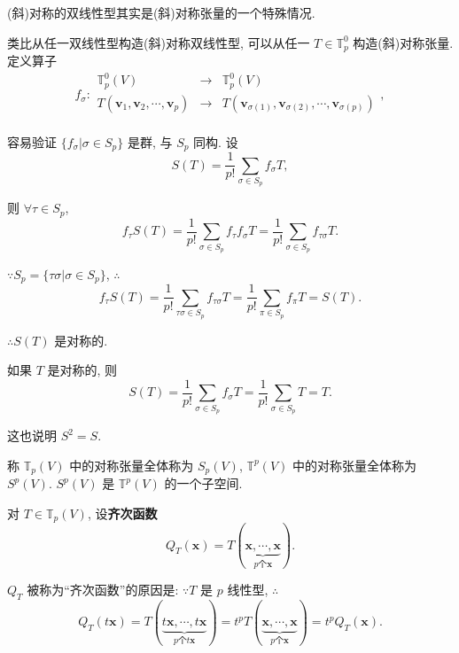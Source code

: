 \documentclass[color=black,device=normal,lang=cn,mode=geye]{elegantnote}
\begin{document}
(斜)对称的双线性型其实是(斜)对称张量的一个特殊情况.

类比从任一双线性型构造(斜)对称双线性型, 可以从任一 $T\in\mathbb{T}_p^0$ 构造(斜)对称张量. 定义算子
\[f_\sigma:\begin{array}{rcl}
    \mathbb{T}_p^0(V) & \to & \mathbb{T}_p^0(V) \\
    T(\boldsymbol{v}_1,\boldsymbol{v}_2,\cdots,\boldsymbol{v}_p) & \to & T(\boldsymbol{v}_{\sigma(1)},\boldsymbol{v}_{\sigma(2)},\cdots,\boldsymbol{v}_{\sigma(p)}) \\
\end{array},\]

容易验证 $\{f_\sigma|\sigma\in S_p\}$ 是群, 与 $S_p$ 同构. 设
\[S(T)=\dfrac{1}{p!}\sum\limits_{\sigma\in S_p}f_\sigma T,\]

则 $\forall\tau\in S_p$,
\[f_\tau S(T)=\dfrac{1}{p!}\sum\limits_{\sigma\in S_p}f_\tau f_\sigma T=\dfrac{1}{p!}\sum\limits_{\sigma\in S_p}f_{\tau\sigma}T.\]

$\because S_p=\{\tau\sigma|\sigma\in S_p\}$, $\therefore$
\[f_\tau S(T)=\dfrac{1}{p!}\sum\limits_{\tau\sigma\in S_p}f_{\tau\sigma} T=\dfrac{1}{p!}\sum\limits_{\pi\in S_p}f_\pi T=S(T).\]

$\therefore S(T)$ 是对称的.

如果 $T$ 是对称的, 则
\[S(T)=\dfrac{1}{p!}\sum\limits_{\sigma\in S_p}f_\sigma T=\dfrac{1}{p!}\sum\limits_{\sigma\in S_p}T=T.\]

这也说明 $S^2=S$.

称 $\mathbb{T}_p(V)$ 中的对称张量全体称为 $S_p(V)$, $\mathbb{T}^p(V)$ 中的对称张量全体称为 $S^p(V)$. $S^p(V)$ 是 $\mathbb{T}^p(V)$ 的一个子空间.

对 $T\in\mathbb{T}_p(V)$, 设\textbf{齐次函数}
\begin{equation}\label{eq3.1}
    Q_T(\boldsymbol{x})=T(\underbrace{\boldsymbol{x},\cdots,\boldsymbol{x}}_{p\text{个}\boldsymbol{x}}).
\end{equation}

$Q_T$ 被称为``齐次函数''的原因是: $\because T$ 是 $p$ 线性型, $\therefore$
\[Q_T(t\boldsymbol{x})=T(\underbrace{t\boldsymbol{x},\cdots,t\boldsymbol{x}}_{p\text{个}t\boldsymbol{x}})=t^pT(\underbrace{\boldsymbol{x},\cdots,\boldsymbol{x}}_{p\text{个}\boldsymbol{x}})=t^pQ_T(\boldsymbol{x}).\]
\end{document}
